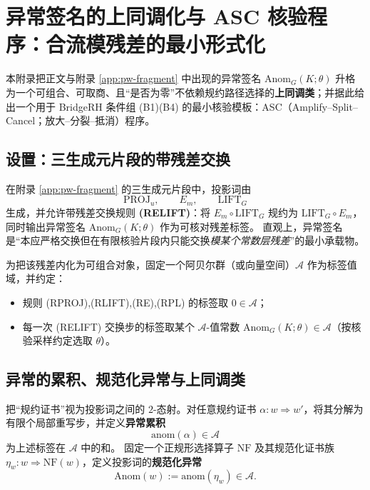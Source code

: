 \section{异常签名的上同调化与 ASC 核验程序：合流模残差的最小形式化}\label{app:anom-cohomology-asc}

本附录把正文与附录 \ref{app:pw-fragment} 中出现的异常签名 $\mathrm{Anom}_G(K;\theta)$ 升格为一个可组合、可取商、且“是否为零”不依赖规约路径选择的\textbf{上同调类}；并据此给出一个用于 BridgeRH 条件组 (B1)(B4) 的最小核验模板：ASC（Amplify--Split--Cancel；放大--分裂--抵消）程序。

\subsection{设置：三生成元片段的带残差交换}\label{subsec:anom-setup}
在附录 \ref{app:pw-fragment} 的三生成元片段中，投影词由
$$
\mathrm{PROJ}_u,\qquad E_m,\qquad \mathrm{LIFT}_G
$$
生成，并允许带残差交换规则 \textbf{(RELIFT)}：将 $E_m\circ\mathrm{LIFT}_G$ 规约为 $\mathrm{LIFT}_G\circ E_m$，同时输出异常签名 $\mathrm{Anom}_G(K;\theta)$ 作为可核对残差标签。
直观上，异常签名是“本应严格交换但在有限核验片段内只能交换\emph{模某个常数层残差}”的最小承载物。

为把该残差内化为可组合对象，固定一个阿贝尔群（或向量空间）$\mathcal{A}$ 作为标签值域，并约定：
\begin{itemize}
  \item 规则 (RPROJ),(RLIFT),(RE),(RPL) 的标签取 $0\in\mathcal{A}$；
  \item 每一次 (RELIFT) 交换步的标签取某个 $\mathcal{A}$-值常数 $\mathrm{Anom}_G(K;\theta)\in\mathcal{A}$（按核验采样约定选取 $\theta$）。
\end{itemize}

\subsection{异常的累积、规范化异常与上同调类}\label{subsec:anom-cohomology}

\begin{definition}[异常累积与规范化异常]\label{def:anom-accumulation}
把“规约证书”视为投影词之间的 $2$-态射。对任意规约证书 $\alpha:w\Rightarrow w'$，将其分解为有限个局部重写步，并定义\textbf{异常累积}
$$
\mathrm{anom}(\alpha)\in\mathcal{A}
$$
为上述标签在 $\mathcal{A}$ 中的和。
固定一个正规形选择算子 $\mathrm{NF}$ 及其规范化证书族 $\eta_w:w\Rightarrow \mathrm{NF}(w)$，定义投影词的\textbf{规范化异常}
$$
\mathrm{Anom}(w):=\mathrm{anom}(\eta_w)\in\mathcal{A}.
$$
\end{definition}

